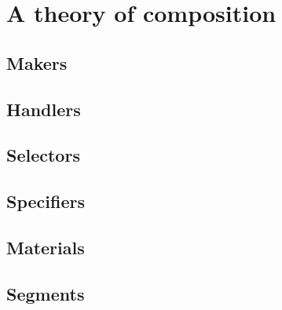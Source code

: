 \chapter{A theory of composition}

\section{Makers}

\section{Handlers}

\section{Selectors}

\section{Specifiers}

\section{Materials}

\section{Segments}
